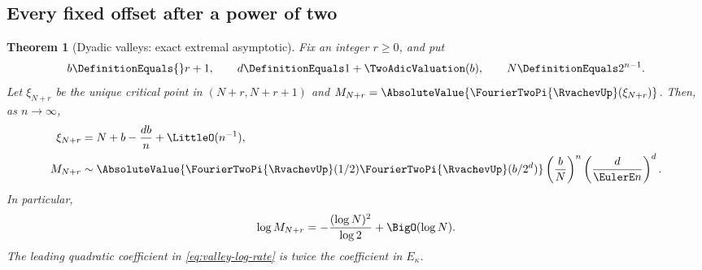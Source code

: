 \documentclass[11pt,oneside]{article}
\numberwithin{equation}{section}
\newtheorem{theorem}{Theorem}[section]
\theoremstyle{definition}
\theoremstyle{remark}
\begin{document}
\subsection{Every fixed offset after a power of two}

\begin{theorem}[Dyadic valleys: exact extremal asymptotic]
\label{thm:dyadic-valleys}
Fix an integer $r\ge0$, and put
\[
 b\DefinitionEquals{}r+1,
 \qquad
 d\DefinitionEquals1+\TwoAdicValuation(b),
 \qquad
 N\DefinitionEquals2^{n-1}.
\]
Let $\xi_{N+r}$ be the unique critical point in $(N+r,N+r+1)$ and
$M_{N+r}=\AbsoluteValue{\FourierTwoPi{\RvachevUp}(\xi_{N+r})}$.  Then, as $n\to\infty$,
\begin{align}
 \xi_{N+r}
 &=N+b-\frac{db}{n}+\LittleO(n^{-1}),
 \label{eq:valley-location}\\
 M_{N+r}
 &\sim
 \AbsoluteValue{\FourierTwoPi{\RvachevUp}(1/2)\FourierTwoPi{\RvachevUp}(b/2^d)}
 \left(\frac bN\right)^n
 \left(\frac d{\EulerE n}\right)^d.
 \label{eq:valley-amplitude}
\end{align}
In particular,
\begin{equation}
 \log M_{N+r}
 =-\frac{(\log N)^2}{\log2}+\BigO(\log N).
 \label{eq:valley-log-rate}
\end{equation}
The leading quadratic coefficient in \eqref{eq:valley-log-rate} is twice the coefficient in
$E_\kappa$.
\end{theorem}
\end{document}
